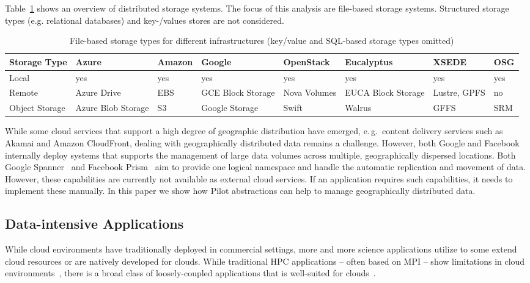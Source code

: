 \documentclass[times]{cpeauth}
\newcommand{\pilot}{Pilot\xspace}
\begin{document}
Table~\ref{tab:storage-systems} shows an overview of distributed
storage systems. The focus of this analysis are file-based storage
systems. Structured storage types (e.g. relational databases) and
key-/values stores are not considered.

\begin{table}[t]
\centering
\begin{tabular}{|p{1.7cm}|p{1.3cm}|p{1.3cm}|p{1.3cm}|p{1.4cm}|p{1.4cm}|p{1.3cm}|p{1.2cm}|}
	\hline
	\textbf{Storage Type} &\textbf{Azure} &\textbf{Amazon} &\textbf{Google} &\textbf{Open\-Stack} &\textbf{Euca\-lyptus} &\textbf{XSEDE}  &\textbf{OSG} \\
	\hline
	Local	&yes &yes &yes &yes &yes &yes &yes\\
	\hline
	Remote &Azure Drive &EBS &GCE Block Storage &Nova Volumes &EUCA Block Storage &Lustre, GPFS 
	&no\\
	\hline
	Object Storage &Azure Blob Storage &S3 &Google Storage &Swift & Walrus &GFFS
	 &SRM\\
	\hline	
\end{tabular}
\caption{File-based storage types for different infrastructures (key/value and 
SQL-based storage types omitted)  \label{tab:storage-systems}}
\end{table}


While some cloud services that support a high degree of geographic
distribution have emerged, e.\,g.\ content delivery services such as
Akamai and Amazon CloudFront, dealing with geographically distributed
data remains a challenge. However, both Google and Facebook internally
deploy systems that supports the management of large data volumes
across multiple, geographically dispersed locations. Both Google
Spanner~\cite{dean09} and Facebook Prism~\cite{Metz12} aim to provide
one logical namespace and handle the automatic replication and
movement of data. However, these capabilities are currently not
available as external cloud services. If an application requires such
capabilities, it needs to implement these manually. In this paper we
show how \pilot abstractions can help to manage geographically
distributed data.


\subsection{Data-intensive Applications}

While cloud environments have traditionally deployed in commercial settings,
more and more science applications utilize to some extend cloud resources or
are natively developed for clouds. While traditional HPC applications -- often
based on MPI -- show limitations in cloud
environments~\cite{Evangelinos2008,Mehrotra:2012:PEA:2287036.2287045}, there
is a broad class of loosely-coupled applications that is well-suited for
clouds~\cite{1851544,Sehgal2011590}.
\end{document}
